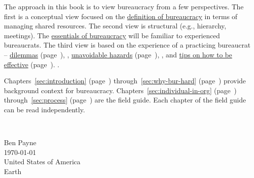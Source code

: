 
The approach in this book is to view bureaucracy from a few perspectives. The first is a conceptual view focused on the \hyperref[sec:define-bureaucracy]{definition of bureaucracy} 
in terms of managing shared resources. The second view is structural (e.g., hierarchy, meetings). The \hyperref[sec:fundamentals-of-b]{essentials of bureaucracy} 
will be familiar to experienced bureaucrats. 
The third view is based on the experience of a practicing bureaucrat -- 
\hyperref[sec:dilemma-trilemma]{dilemmas}
\ifhaspagenumbers
(page~\pageref{sec:dilemma-trilemma}), 
\else
, 
\fi
\hyperref[sec:unavoidable-hazards]{unavoidable hazards}\ifhaspagenumbers
(page~\pageref{sec:unavoidable-hazards}), 
\else
, 
\fi
and 
\hyperref[sec:effective-bureaucrat]{tips on how to be effective}\ifhaspagenumbers
(page~\pageref{sec:effective-bureaucrat}).  
\else
. 
\fi


Chapters~\ref{sec:introduction} 
\ifhaspagenumbers
(page~\pageref{sec:introduction}) 
\fi
through~\ref{sec:why-bur-hard} 
\ifhaspagenumbers
(page~\pageref{sec:why-bur-hard}) 
\fi
provide background context for bureaucracy. 
Chapters~\ref{sec:individual-in-org} 
\ifhaspagenumbers
(page~\pageref{sec:individual-in-org}) 
\fi
through~\ref{sec:process} 
\ifhaspagenumbers
(page~\pageref{sec:process}) 
\fi
are the field guide. 
Each chapter of the field guide can be read independently. 



\ \\

\begin{flushright}
Ben Payne\\
\today\\
United States of America\\
Earth
\end{flushright}


